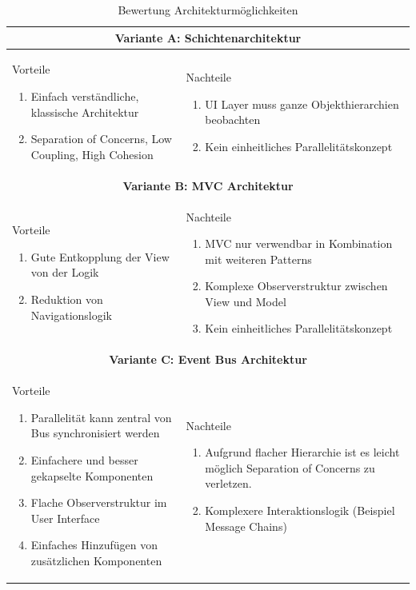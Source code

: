 \begin{table}[H]
\begin{tabular}{|p{}|p{}|}
 \hline 
\multicolumn{2}{|c|}{\textbf{Variante A: Schichtenarchitektur}}\\ \hline 
Vorteile
\begin{enumerate}
\item Einfach verständliche, klassische Architektur
\item Separation of Concerns, Low Coupling, High Cohesion
\end{enumerate} & 
Nachteile
\begin{enumerate}
\item \ac{UI} Layer muss ganze Objekthierarchien beobachten
\item Kein einheitliches Parallelitätskonzept
\end{enumerate}
\\ \hline

\multicolumn{2}{|c|}{\textbf{Variante B: MVC Architektur \cite[146 ff.]{mossenbock2012object}}}\\ \hline 
Vorteile
\begin{enumerate}
\item Gute Entkopplung der View von der Logik
\item Reduktion von Navigationslogik
\end{enumerate} &
Nachteile
\begin{enumerate}
\item \ac{MVC} nur verwendbar in Kombination mit weiteren Patterns
\item Komplexe Observerstruktur zwischen View und Model
\item Kein einheitliches Parallelitätskonzept
\end{enumerate}
\\ \hline

\multicolumn{2}{|c|}{\textbf{Variante C: Event Bus Architektur}}\\ \hline 
Vorteile
\begin{enumerate}
\item Parallelität kann zentral von Bus synchronisiert werden
\item Einfachere und besser gekapselte Komponenten
\item Flache Observerstruktur im User Interface
\item Einfaches Hinzufügen von zusätzlichen Komponenten
\end{enumerate} &
Nachteile
\begin{enumerate}
\item Aufgrund flacher Hierarchie ist es leicht möglich Separation of Concerns zu verletzen.
\item Komplexere Interaktionslogik (Beispiel Message Chains)
\end{enumerate}
\\ \hline
\end{tabular}
\caption{Bewertung Architekturmöglichkeiten}
\end{table}

